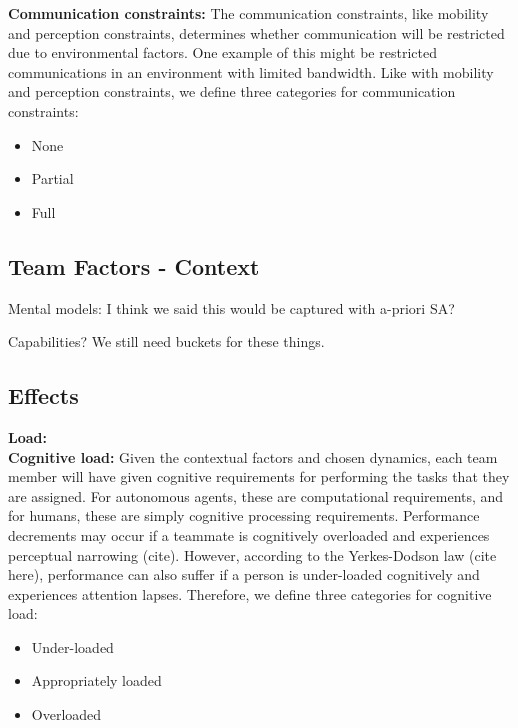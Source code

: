 \documentclass[letterpaper, 10 pt, conference]{ieeeconf}  %
\theoremstyle{definition}
\begin{document}
\textbf{Communication constraints:} The communication constraints, like mobility and perception constraints, determines whether communication will be restricted due to environmental factors. One example of this might be restricted communications in an environment with limited bandwidth. Like with mobility and perception constraints, we define three categories for communication constraints:
\begin{itemize}
    \item None
    \item Partial
    \item Full
\end{itemize}

\subsection{Team Factors - Context}
Mental models: I think we said this would be captured with a-priori SA?

Capabilities? We still need buckets for these things.


\subsection{Effects}
\textbf{Load:}\\
\textbf{Cognitive load:} Given the contextual factors and chosen dynamics, each team member will have given cognitive requirements for performing the tasks that they are assigned. For autonomous agents, these are computational requirements, and for humans, these are simply cognitive processing requirements. Performance decrements may occur if a teammate is cognitively overloaded and experiences perceptual narrowing (cite). However, according to the Yerkes-Dodson law (cite here), performance can also suffer if a person is under-loaded cognitively and experiences attention lapses. Therefore, we define three categories for cognitive load:
\begin{itemize}
    \item Under-loaded
    \item Appropriately loaded
    \item Overloaded
\end{itemize}
\end{document}

